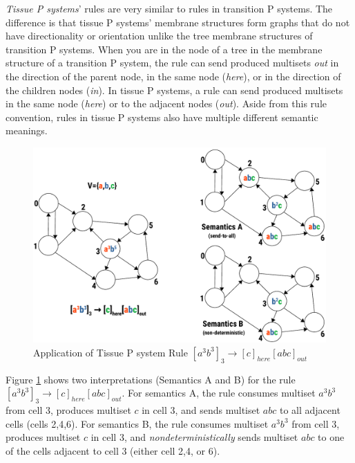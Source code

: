 \documentclass{article}
\begin{document}
\textit{Tissue P systems}' \cite{tissue-p} rules are very similar to rules in transition P systems. 
The difference is that tissue P systems' membrane structures form graphs that do not have
directionality or orientation unlike the tree membrane structures of transition P systems. When you
are in the node of a tree in the membrane structure of a transition P system, the rule can send 
produced multisets \textit{out} in the direction of the parent node, in the same node 
(\textit{here}), or in the direction of the children nodes (\textit{in}). In tissue P systems, a 
rule can send produced multisets in the same node (\textit{here}) or to the adjacent nodes 
(\textit{out}). Aside from this rule convention, rules in tissue P systems also have multiple 
different semantic meanings.

\begin{figure}[H]
\begin{center}
\includegraphics[scale=0.55]{figures/zzz-tissue-rule.pdf}
\caption{Application of Tissue P system Rule $[a^3b^3]_3 \rightarrow [c]_{here}[abc]_{out}$}
\label{fig:tissue-rule}
\end{center}
\end{figure}

Figure \ref{fig:tissue-rule} shows two interpretations (Semantics A and B) for the rule 
$[a^3b^3]_3 \rightarrow [c]_{here}[abc]_{out}$. For semantics A, the rule consumes multiset 
$a^3b^3$ from cell 3, produces multiset $c$ in cell 3, and sends multiset $abc$ to all adjacent
cells (cells 2,4,6). For semantics B, the rule consumes multiset $a^3b^3$ from cell 3, produces
multiset $c$ in cell 3, and \textit{nondeterministically} sends multiset $abc$ to one of the
cells adjacent to cell 3 (either cell 2,4, or 6).
\end{document}
